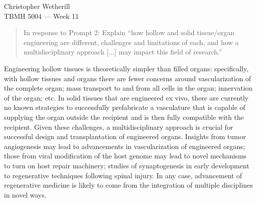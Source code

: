 \documentclass[11pt,letterpaper,final] {article}
\begin{document}

\noindent Christopher Wetherill\\
TBMH 5004 --- Week 11

\begin{quotation}
	In response to Prompt 2: Explain ``how hollow and solid tissue/organ engineering are 
different, challenges and limitations of each, and how a multidisciplinary approach [...] may impact this field of research.''
\end{quotation}

Engineering hollow tissues is theoretically simpler than filled organs: specifically, with hollow tissues and organs there are fewer concerns around vascularization of the complete organ; mass transport to and from all cells in the organ; innervation of the organ; etc. In solid tissues that are engineered ex vivo, there are currently no known strategies to successfully prefabricate a vasculature that is capable of supplying the organ outside the recipient and is then fully compatible with the recipient. Given these challenges, a multidisciplinary approach is crucial for successful design and transplantation of engineered organs. Insights from tumor angiogenesis may lead to advancements in vascularization of engineered organs; those from viral modification of the host genome may lead to novel mechanisms to turn on host repair machinery; studies of synaptogenesis in early development to regenerative techniques following spinal injury. In any case, advancement of regenerative medicine is likely to come from the integration of multiple disciplines in novel ways.
\end{document}
